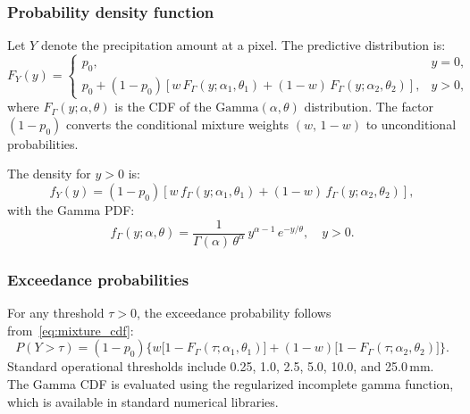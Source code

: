 \documentclass[11pt]{article}
\begin{document}
\subsubsection{Probability density function}
\label{sec:pdf}

Let $Y$ denote the precipitation amount at a pixel.  The predictive
distribution is:
\begin{equation}
  F_Y(y) =
  \begin{cases}
    p_0, & y = 0, \\[4pt]
    p_0 + (1 - p_0)\!\left[w \, F_{\Gamma}(y; \alpha_1, \theta_1)
        + (1-w) \, F_{\Gamma}(y; \alpha_2, \theta_2)\right],
    & y > 0,
  \end{cases}
  \label{eq:mixture_cdf}
\end{equation}
where $F_{\Gamma}(y; \alpha, \theta)$ is the CDF of the
$\text{Gamma}(\alpha, \theta)$ distribution.  The factor $(1-p_0)$
converts the conditional mixture weights $(w,\,1-w)$ to
unconditional probabilities.

The density for $y > 0$ is:
\begin{equation}
  f_Y(y) = (1 - p_0)\!\left[w \, f_{\Gamma}(y; \alpha_1, \theta_1)
          + (1-w) \, f_{\Gamma}(y; \alpha_2, \theta_2)\right],
  \label{eq:mixture_pdf}
\end{equation}
with the Gamma PDF:
\begin{equation}
  f_{\Gamma}(y; \alpha, \theta)
    = \frac{1}{\Gamma(\alpha)\,\theta^{\alpha}}
      \, y^{\alpha - 1} \, e^{-y/\theta},
  \quad y > 0.
  \label{eq:gamma_pdf}
\end{equation}

\subsubsection{Exceedance probabilities}
\label{sec:exceedance}

For any threshold $\tau > 0$, the exceedance probability follows
from~\eqref{eq:mixture_cdf}:
\begin{equation}
  P(Y > \tau) = (1 - p_0)\Big\{
    w \big[1 - F_{\Gamma}(\tau; \alpha_1, \theta_1)\big]
    + (1-w) \big[1 - F_{\Gamma}(\tau; \alpha_2, \theta_2)\big]
  \Big\}.
  \label{eq:exceedance}
\end{equation}
Standard operational thresholds include 0.25, 1.0, 2.5, 5.0,
10.0, and 25.0\,mm.  The Gamma CDF is evaluated using the
regularized incomplete gamma function, which is available in
standard numerical libraries.

\end{document}

